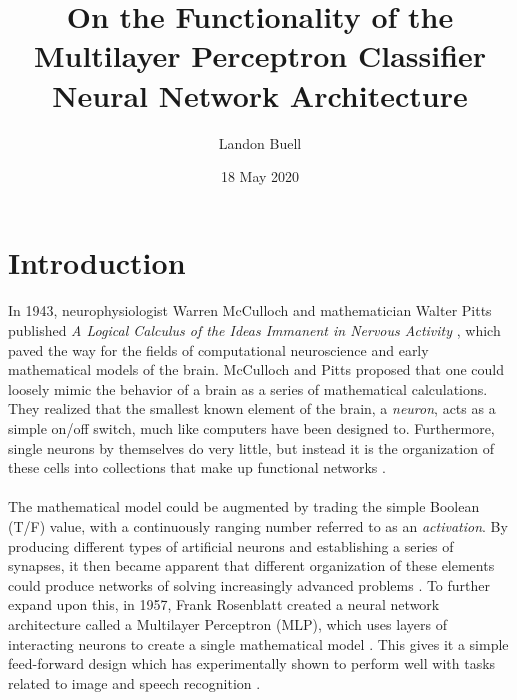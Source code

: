 \documentclass[12pt,letterpaper]{article}
\begin{document}

\title{On the Functionality of the Multilayer Perceptron Classifier Neural Network Architecture}
\date{18 May 2020}
\author{Landon Buell}
\maketitle


\section{Introduction}

\paragraph*{}In 1943, neurophysiologist Warren McCulloch and mathematician Walter Pitts published \textit{A Logical Calculus of the Ideas Immanent in Nervous Activity} \cite{McCulloch}, which paved the way for the fields of computational neuroscience and early mathematical models of the brain. McCulloch and Pitts proposed that one could loosely mimic the behavior of a brain as a series of mathematical calculations. They realized that the smallest known element of the brain, a \textit{neuron}, acts as a simple on/off switch, much like computers have been designed to. Furthermore, single neurons by themselves do very little, but instead it is the organization of these cells into collections that make up functional networks \cite{Geron,Levine,McCulloch}. 

\paragraph*{}The mathematical model could be augmented by trading the simple Boolean (T/F) value, with a continuously ranging number referred to as an \textit{activation}. By producing different types of artificial neurons and establishing a series of synapses, it then became apparent that different organization of these elements could produce networks of solving increasingly advanced problems \cite{Goodfellow}. To further expand upon this, in 1957, Frank Rosenblatt created a neural network architecture called a Multilayer Perceptron (MLP), which uses layers of interacting neurons to create a single mathematical model \cite{Geron,Petrik}. This gives it a simple feed-forward design which has experimentally shown to perform well with tasks related to image and speech recognition \cite{Goodfellow,Loy}.
\end{document}
